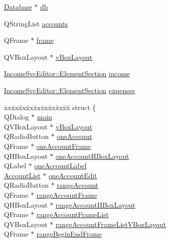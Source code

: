\begin{CompactItemize}
\item 
\hyperlink{classDatabase}{Database} $\ast$ \hyperlink{classIncomeSvcEditor_r0}{db}
\item 
QString\-List \hyperlink{classIncomeSvcEditor_r1}{accounts}
\item 
QFrame $\ast$ \hyperlink{classIncomeSvcEditor_r2}{frame}
\item 
QVBox\-Layout $\ast$ \hyperlink{classIncomeSvcEditor_r3}{v\-Box\-Layout}
\item 
\hyperlink{structIncomeSvcEditor_1_1ElementSection}{Income\-Svc\-Editor::Element\-Section} \hyperlink{classIncomeSvcEditor_r4}{income}
\item 
\hyperlink{structIncomeSvcEditor_1_1ElementSection}{Income\-Svc\-Editor::Element\-Section} \hyperlink{classIncomeSvcEditor_r5}{expenses}
\item 
\begin{tabbing}
xx\=xx\=xx\=xx\=xx\=xx\=xx\=xx\=xx\=\kill
struct \{\\
\>QDialog $\ast$ \hyperlink{classIncomeSvcEditor_r6}{main}\\
\>QVBoxLayout $\ast$ \hyperlink{classIncomeSvcEditor_r7}{vBoxLayout}\\
\>QRadioButton $\ast$ \hyperlink{classIncomeSvcEditor_r8}{oneAccount}\\
\>QFrame $\ast$ \hyperlink{classIncomeSvcEditor_r9}{oneAccountFrame}\\
\>QHBoxLayout $\ast$ \hyperlink{classIncomeSvcEditor_r10}{oneAccountHBoxLayout}\\
\>QLabel $\ast$ \hyperlink{classIncomeSvcEditor_r11}{oneAccountLabel}\\
\>\hyperlink{classAccountList}{AccountList} $\ast$ \hyperlink{classIncomeSvcEditor_r12}{oneAccountEdit}\\
\>QRadioButton $\ast$ \hyperlink{classIncomeSvcEditor_r13}{rangeAccount}\\
\>QFrame $\ast$ \hyperlink{classIncomeSvcEditor_r14}{rangeAccountFrame}\\
\>QHBoxLayout $\ast$ \hyperlink{classIncomeSvcEditor_r15}{rangeAccountHBoxLayout}\\
\>QFrame $\ast$ \hyperlink{classIncomeSvcEditor_r16}{rangeAccountFrameList}\\
\>QVBoxLayout $\ast$ \hyperlink{classIncomeSvcEditor_r17}{rangeAccountFrameListVBoxLayout}\\
\>QFrame $\ast$ \hyperlink{classIncomeSvcEditor_r18}{rangeBeginEndFrame}\\

\end{tabbing}
\end{CompactItemize}
